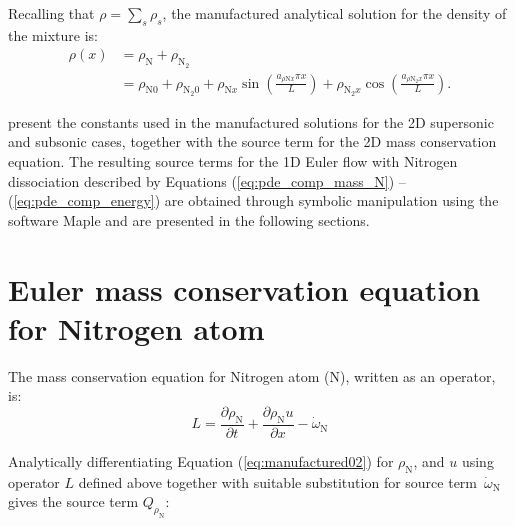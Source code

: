 \documentclass[10pt]{article}
\newcommand{\diff}[2] {\dfrac{\partial #1 }{\partial #2}}
\begin{document}
Recalling that $\rho=\sum_s \rho_s$, the manufactured analytical solution for the density of the mixture  is:
\begin{equation}
\label{eq:manufactured03}
\begin{split}
\rho(x) &= \rho_{\text{N}}+\rho_{\text{N}_2}\\
                     &= \rho_{\text{N}0} + \rho_{\text{N}_2 0} +
\rho_{\text{N}x} \sin\left(\frac{a_{  \rho \text{N} x }\pi x}{L}\right) + \rho_{\text{N}_2 x} \cos\left(\frac{a_{ \rho \text{N}_2 x } \pi x}{L}\right) .
\end{split}
\end{equation}




\citet{Roy2002} present the constants used in the manufactured solutions for the 2D supersonic and subsonic cases, together with the source term for the 2D mass conservation equation. The resulting source terms for the 1D Euler flow with Nitrogen dissociation described by Equations (\ref{eq:pde_comp_mass_N}) -- (\ref{eq:pde_comp_energy}) are obtained through symbolic manipulation using the software Maple and are presented in the following sections.


\section{Euler mass conservation equation for Nitrogen atom}

The mass conservation equation for Nitrogen atom (N), written as an operator, is:
\begin{equation}
 \label{eq:euler1d_11}
L= \diff{\rho_\text{N}}{t} + \diff{\rho_\text{N} u}{x} - \dot{\omega}_{\text{N}}
\end{equation}

Analytically differentiating Equation (\ref{eq:manufactured02}) for $\rho_{\text{N}}$,  and $u$ using operator $L$ defined above together with suitable substitution for source term~$\dot{\omega}_\text{N}$ gives the source term $Q_{\rho_{\text{N}}}$:
\end{document}
